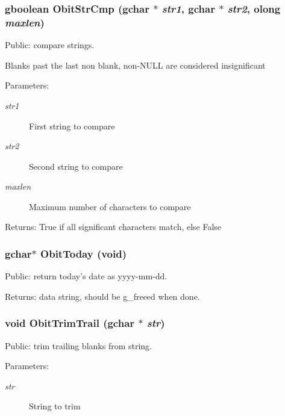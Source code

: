 \subsubsection{\setlength{\rightskip}{0pt plus 5cm}gboolean Obit\-Str\-Cmp (gchar $\ast$ {\em str1}, gchar $\ast$ {\em str2}, {\bf olong} {\em maxlen})}\label{Obit_8c_a13}


Public: compare strings. 

Blanks past the last non blank, non-NULL are considered insignificant \begin{Desc}
\item[Parameters:]
\begin{description}
\item[{\em str1}]First string to compare \item[{\em str2}]Second string to compare \item[{\em maxlen}]Maximum number of characters to compare \end{description}
\end{Desc}
\begin{Desc}
\item[Returns:]True if all significant characters match, else False \end{Desc}
\subsubsection{\setlength{\rightskip}{0pt plus 5cm}gchar$\ast$ Obit\-Today (void)}\label{Obit_8c_a14}


Public: return today's date as yyyy-mm-dd. 

\begin{Desc}
\item[Returns:]data string, should be g\_\-freeed when done. \end{Desc}
\subsubsection{\setlength{\rightskip}{0pt plus 5cm}void Obit\-Trim\-Trail (gchar $\ast$ {\em str})}\label{Obit_8c_a12}


Public: trim trailing blanks from string. 

\begin{Desc}
\item[Parameters:]
\begin{description}
\item[{\em str}]String to trim \end{description}
\end{Desc}
